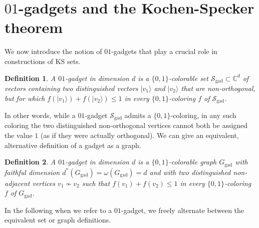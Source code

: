 \documentclass[twocolumn, a4paper, superscriptaddress,nofootinbib, accepted=2020-08-07, hyperref]{quantumarticle}
\newtheorem{dfn}{Definition}
\begin{document}





\section{$01$-gadgets and the Kochen-Specker theorem}\label{sec:gadget}
We now introduce the notion of $01$-gadgets that play a crucial role in constructions of KS sets. 
\begin{dfn}
	A $01$-gadget in dimension $d$ is a $\{0,1\}$-colorable set $\mathcal{S}_\text{gad}\subset\mathbb{C}^d$ of vectors containing two distinguished vectors $|v_1\rangle$ and $|v_2\rangle$ that are non-orthogonal, but for which $f(|v_1\rangle)+f(|v_2\rangle)\leq 1$ in every $\{0,1\}$-coloring $f$ of $\mathcal{S}_\text{gad}$.
\end{dfn}
In other words, while a $01$-gadget $\mathcal{S}_\text{gad}$ admits a $\{0,1\}$-coloring, in any such coloring the two distinguished non-orthogonal vertices cannot both be assigned the value $1$ (as if they were actually orthogonal).
We can give an equivalent, alternative definition of a gadget as a graph.
\begin{dfn}
	A $01$-gadget in dimension $d$ is a $\{0,1\}$-colorable graph $G_\text{gad}$ with faithful dimension $d^*(G_\text{gad})=\omega(G_\text{gad})=d$ and with two distinguished non-adjacent vertices $v_1 \nsim v_2$ such that $f(v_1)+f(v_2)\leq 1$ in every $\{0,1\}$-coloring $f$ of $G_\text{gad}$.
\end{dfn}
In the following when we refer to a $01$-gadget, we freely alternate between the equivalent set or graph definitions.
\end{document}
